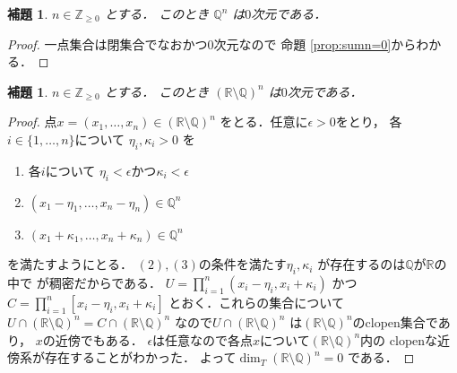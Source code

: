 \documentclass[leqno, a4paper, 12pt]{jsarticle}
\newtheorem{lem}[thm]{補題}
\newcommand{\zz}{\mathbb{Z}}
\newcommand{\qq}{\mathbb{Q}}
\newcommand{\rr}{\mathbb{R}}
\numberwithin{equation}{section}
\begin{document}
\begin{lem}\label{lem:qq00}
$n\in \zz_{\ge 0}$
とする．
このとき
$\qq^{n}$
は$0$次元である．
\end{lem}
\begin{proof}
一点集合は閉集合でなおかつ$0$次元なので
命題 \ref{prop:sumn=0}からわかる．
\end{proof}


\begin{lem}\label{lem:pp00}
$n\in \zz_{\ge 0}$
とする．
このとき
$(\rr\setminus \qq)^{n}$
は$0$次元である．
\end{lem}
\begin{proof}
点$x=(x_{1}, \dots, x_{n})\in (\rr\setminus \qq)^{n}$
をとる．任意に$\epsilon >0$をとり，
各$i\in \{1, \dots, n\}$について
$\eta_{i}, \kappa_{i}>0$
を
\begin{enumerate}
\item 各$i$について
$\eta_{i}<\epsilon$かつ$\kappa_{i}<\epsilon$
\item $(x_{1}-\eta_{1}, \dots, x_{n}-\eta_{n})\in \qq^{n}$
\item $(x_{1}+\kappa_{1}, \dots, x_{n}+\kappa_{n})\in \qq^{n}$
\end{enumerate}
を満たすようにとる．
$(2), (3)$の条件を満たす$\eta_{i}, \kappa_{i}$
が存在するのは$\qq$が$\rr$の中で
が稠密だからである．
$U=\prod_{i=1}^{n}(x_{i}-\eta_{i}, x_{i}+\kappa_{i})$
かつ
$C=\prod_{i=1}^{n}[x_{i}-\eta_{i}, x_{i}+\kappa_{i}]$
とおく．これらの集合について
$U\cap(\rr\setminus \qq)^{n}=C\cap (\rr\setminus \qq)^{n}$
なので$U\cap(\rr\setminus \qq)^{n}$
は$(\rr\setminus \qq)^{n}$のclopen集合であり，
$x$の近傍でもある．
$\epsilon$は任意なので各点$x$について$(\rr\setminus \qq)^{n}$内の
clopenな近傍系が存在することがわかった．
よって$\dim_{T}(\rr\setminus \qq)^{n}=0$
である．
\end{proof}
\end{document}
